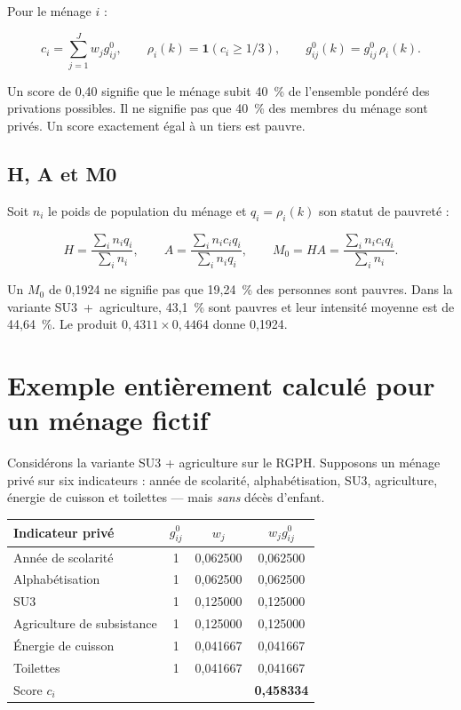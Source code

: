 \documentclass[11pt,a4paper]{article}
\begin{document}
Pour le ménage $i$ :

\[
  c_i = \sum_{j=1}^{J} w_j g^0_{ij},
  \qquad
  \rho_i(k) = \mathbf{1}(c_i \geq 1/3),
  \qquad
  g^0_{ij}(k) = g^0_{ij}\,\rho_i(k).
\]

Un score de 0,40 signifie que le ménage subit 40~\% de l'ensemble pondéré des privations
possibles. Il ne signifie pas que 40~\% des membres du ménage sont privés. Un score exactement
égal à un tiers est pauvre.

\subsection{H, A et M0}

Soit $n_i$ le poids de population du ménage et $q_i=\rho_i(k)$ son statut de pauvreté :

\[
  H = \frac{\sum_i n_i q_i}{\sum_i n_i},
  \qquad
  A = \frac{\sum_i n_i c_i q_i}{\sum_i n_i q_i},
  \qquad
  M_0 = H A = \frac{\sum_i n_i c_i q_i}{\sum_i n_i}.
\]

\begin{attention}
Un $M_0$ de 0,1924 ne signifie pas que 19,24~\% des personnes sont pauvres. Dans la variante
SU3~+~agriculture, 43,1~\% sont pauvres et leur intensité moyenne est de 44,64~\%. Le produit
$0{,}4311 \times 0{,}4464$ donne 0,1924.
\end{attention}

\section{Exemple entièrement calculé pour un ménage fictif}

Considérons la variante SU3 + agriculture sur le RGPH. Supposons un ménage privé sur six
indicateurs : année de scolarité, alphabétisation, SU3, agriculture, énergie de cuisson et
toilettes --- mais \emph{sans} décès d'enfant.

\begin{center}
\small
\begin{tabular}{@{}lccc@{}}
\toprule
\textbf{Indicateur privé} & $g^0_{ij}$ & $w_j$ & $w_jg^0_{ij}$ \\
\midrule
Année de scolarité & 1 & 0,062500 & 0,062500 \\
Alphabétisation & 1 & 0,062500 & 0,062500 \\
SU3 & 1 & 0,125000 & 0,125000 \\
Agriculture de subsistance & 1 & 0,125000 & 0,125000 \\
Énergie de cuisson & 1 & 0,041667 & 0,041667 \\
Toilettes & 1 & 0,041667 & 0,041667 \\
\midrule
Score $c_i$ & & & \textbf{0,458334} \\
\bottomrule
\end{tabular}
\end{center}
\end{document}
